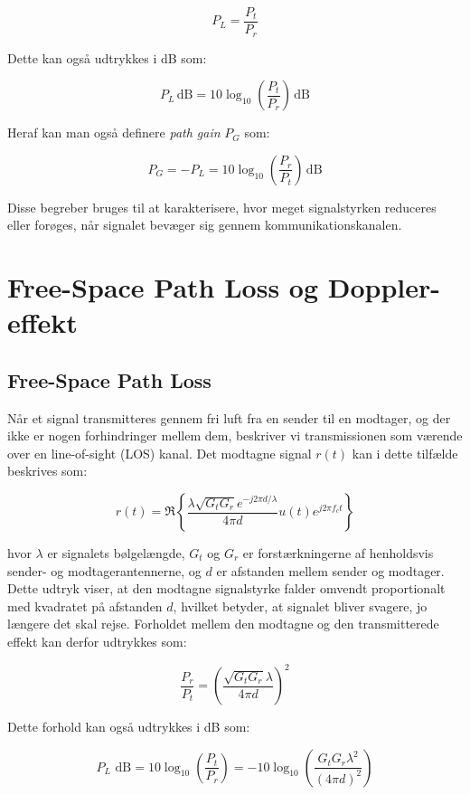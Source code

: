 \documentclass[a4paper,12pt]{book}
\begin{document}
	\[
	P_L = \frac{P_t}{P_r}
	\]
	
	\noindent Dette kan også udtrykkes i dB som:
	
	\[
	P_L \, \text{dB} = 10 \log_{10} \left( \frac{P_t}{P_r} \right) \, \text{dB}
	\]
	
	\noindent Heraf kan man også definere \textit{path gain} \( P_G \) som:
	
	\[
	P_G = -P_L = 10 \log_{10} \left( \frac{P_r}{P_t} \right) \, \text{dB}
	\]
	
	\noindent Disse begreber bruges til at karakterisere, hvor meget signalstyrken reduceres eller forøges, når signalet bevæger sig gennem kommunikationskanalen.
	
	\section{Free-Space Path Loss og Doppler-effekt}
	
	\subsection{Free-Space Path Loss}
	Når et signal transmitteres gennem fri luft fra en sender til en modtager, og der ikke er nogen forhindringer mellem dem, beskriver vi transmissionen som værende over en line-of-sight (LOS) kanal. Det modtagne signal \( r(t) \) kan i dette tilfælde beskrives som:
	
	\[
	r(t) = \Re \left\{ \frac{\lambda \sqrt{G_t G_r} e^{-j2\pi d/\lambda}}{4\pi d} u(t) e^{j2\pi f_c t} \right\}
	\]
	
	\noindent hvor \( \lambda \) er signalets bølgelængde, \( G_t \) og \( G_r \) er forstærkningerne af henholdsvis sender- og modtagerantennerne, og \( d \) er afstanden mellem sender og modtager. Dette udtryk viser, at den modtagne signalstyrke falder omvendt proportionalt med kvadratet på afstanden \( d \), hvilket betyder, at signalet bliver svagere, jo længere det skal rejse.
	\newline\newline\noindent
	Forholdet mellem den modtagne og den transmitterede effekt kan derfor udtrykkes som:
	
	\[
	\frac{P_r}{P_t} = \left( \frac{\sqrt{G_t G_r} \lambda}{4\pi d} \right)^2
	\]
	
	\noindent Dette forhold kan også udtrykkes i dB som:
	
	\[
	P_L \text{ dB} = 10 \log_{10} \left(\frac{P_t}{P_r}\right) = -10 \log_{10} \left( \frac{G_t G_r \lambda^2}{(4\pi d)^2} \right)
	\]
	
\end{document}
